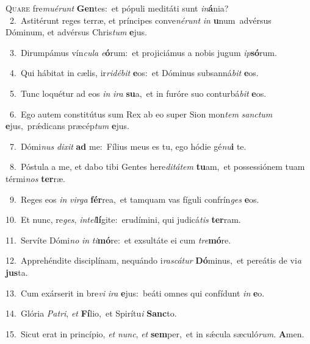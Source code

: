 \lettrine{\initial\textcolor{\initialcolor}{Q}}{uare} fre\-\textit{mu}\-\textit{é}\textit{runt} \textbf{Gen}\-tes:~\star et pópuli meditáti sunt \textit{in}\-\textbf{á}nia?\\
{\numbfont\textcolor{\numbcolor}{~2.}}~Astitérunt reges terræ, et príncipes conve\-\textit{né}\-\textit{runt} \textit{in} \textbf{u}\-num~\star advérsus Dóminum, et advérsus Chris\textit{tum} \textbf{e}\-jus.\par
{\numbfont\textcolor{\numbcolor}{~3.}}~Dirumpámus vín\-\textit{cu}\-\textit{la} \textit{e}\-\textbf{ó}rum:~\star et projiciámus a nobis jugum \textit{ip}\-\textbf{só}rum.\par
{\numbfont\textcolor{\numbcolor}{~4.}}~Qui hábitat in cælis, ir\-\textit{ri}\-\textit{dé}\textit{bit} \textbf{e}\-os:~\star et Dóminus subsanná\textit{bit} \textbf{e}\-os.\par
{\numbfont\textcolor{\numbcolor}{~5.}}~Tunc loquétur ad eos \textit{in} \textit{i}\-\textit{ra} \textbf{su}\-a,~\star et in furóre suo conturbá\textit{bit} \textbf{e}\-os.\par
{\numbfont\textcolor{\numbcolor}{~6.}}~Ego autem constitútus sum Rex ab eo super Sion mon\textit{tem} \textit{sanc}\-\textit{tum} \textbf{e}\-jus,~\star prǽdicans præcép\textit{tum} \textbf{e}\-jus.\par
{\numbfont\textcolor{\numbcolor}{~7.}}~Dómi\textit{nus} \textit{di}\-\textit{xit} \textbf{ad} me:~\star Fílius meus es tu, ego hódie gé\-\textit{nu}\-\textbf{i} te.\par
{\numbfont\textcolor{\numbcolor}{~8.}}~Póstula a me, et dabo tibi Gentes here\-\textit{di}\-\textit{tá}\textit{tem} \textbf{tu}\-am,~\star et possessiónem tuam térmi\textit{nos} \textbf{ter}\-ræ.\par
{\numbfont\textcolor{\numbcolor}{~9.}}~Reges eos \textit{in} \textit{vir}\-\textit{ga} \textbf{fér}\-rea,~\star et tamquam vas fíguli confrín\textit{ges} \textbf{e}\-os.\par
{\numbfont\textcolor{\numbcolor}{10.}}~Et nunc, re\-\textit{ges}\-, \textit{in}\-\textit{tel}\textbf{lí}gite:~\star erudímini, qui judicá\textit{tis} \textbf{ter}\-ram.\par
{\numbfont\textcolor{\numbcolor}{11.}}~Servíte Dómi\textit{no} \textit{in} \textit{ti}\-\textbf{mó}re:~\star et exsultáte ei cum \textit{tre}\-\textbf{mó}re.\par
{\numbfont\textcolor{\numbcolor}{12.}}~Apprehéndite disciplínam, nequándo i\-\textit{ras}\-\textit{cá}\textit{tur} \textbf{Dó}\-minus,~\star et pereátis de vi\textit{a} \textbf{jus}\-ta.\par
{\numbfont\textcolor{\numbcolor}{13.}}~Cum exárserit in bre\textit{vi} \textit{i}\-\textit{ra} \textbf{e}\-jus:~\star beáti omnes qui confídunt \textit{in} \textbf{e}\-o.\par
{\numbfont\textcolor{\numbcolor}{14.}}~Glória \textit{Pa}\-\textit{tri}, \textit{et} \textbf{Fí}\-lio,~\star et Spirítu\textit{i} \textbf{Sanc}\-to.\par
{\numbfont\textcolor{\numbcolor}{15.}}~Sicut erat in princípio, \textit{et} \textit{nunc}\-, \textit{et} \textbf{sem}\-per,~\star et in sǽcula sæculó\-\textit{rum}\-. \textbf{A}\-men.\par
